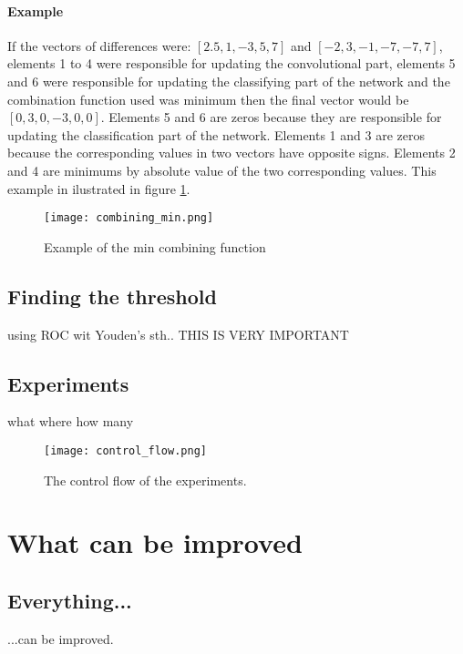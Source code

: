 \documentclass[a4paper,10pt]{report}
\begin{document}
      \subsubsection{Example}
      If the vectors of differences were: $[2.5, 1, -3, 5, 7]$ and $[-2, 3, -1, -7, -7, 7]$, elements 1 to 4 were responsible for updating the convolutional part, elements 5 and 6 were responsible for updating the classifying part of the network and the combination function used was minimum then the final vector would be $[0, 3, 0, -3, 0, 0]$. Elements 5 and 6 are zeros because they are responsible for updating the classification part of the network. Elements 1 and 3 are zeros because the corresponding values in two vectors have opposite signs. Elements 2 and 4 are minimums by absolute value of the two corresponding values. This example in ilustrated in figure \ref{fig:combining}.\\
      
      \begin{figure}[h!]
	  \centering
	  \texttt{[image: combining\_min.png]}
	  \caption{Example of the min combining function}
	  \label{fig:combining}	%
	\end{figure} 
	
      \section{Finding the threshold}
      using ROC wit Youden's sth.. THIS IS VERY IMPORTANT
      
      \section{Experiments}
      what where how many
      
      \begin{figure}[h!]
	  \centering
	  \texttt{[image: control\_flow.png]}
	  \caption{The control flow of the experiments.}
	  \label{fig:control_flow}	%
	\end{figure} 
	
  \chapter{What can be improved} %
    \section{Everything...}
      ...can be improved.\\
\end{document}
